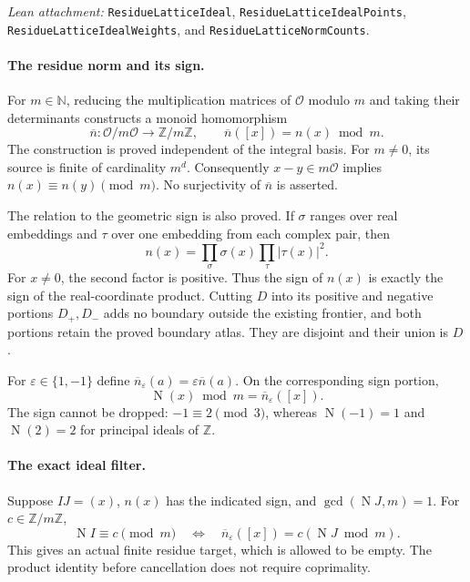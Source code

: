 \documentclass[11pt]{article}
\newcommand{\OO}{\mathcal O}
\newcommand{\ZZ}{\mathbb Z}
\newcommand{\NN}{\mathbb N}
\newcommand{\Nm}{\operatorname N}
\newcommand{\absn}[1]{\lvert #1\rvert}
\begin{document}
\smallskip
\noindent\emph{Lean attachment:}
\texttt{ResidueLatticeIdeal}, \texttt{ResidueLatticeIdealPoints},
\texttt{ResidueLatticeIdealWeights}, and \texttt{ResidueLatticeNormCounts}.

\newpage
\paragraph{The residue norm and its sign.}
For $m\in\NN$, reducing the multiplication matrices of $\OO$ modulo $m$
and taking their determinants constructs a monoid homomorphism
\[
 \overline n:\OO/m\OO\longrightarrow\ZZ/m\ZZ,
 \qquad \overline n([x])=n(x)\bmod m.
\]
The construction is proved independent of the integral basis.
For $m\ne0$, its source is finite of cardinality $m^d$.
Consequently $x-y\in m\OO$ implies $n(x)\equiv n(y)\pmod m$.
No surjectivity of $\overline n$ is asserted.

The relation to the geometric sign is also proved. If $\sigma$ ranges over
real embeddings and $\tau$ over one embedding from each complex pair, then
\[
 n(x)=\prod_{\sigma}\sigma(x)\prod_{\tau}\absn{\tau(x)}^2.
\]
For $x\ne0$, the second factor is positive. Thus the sign of $n(x)$ is
exactly the sign of the real-coordinate product. Cutting $D$ into its
positive and negative portions $D_+,D_-$ adds no boundary outside the
existing frontier, and both portions retain the proved boundary atlas.
They are disjoint and their union is $D$.

For $\varepsilon\in\{1,-1\}$ define
$\overline n_{\varepsilon}(a)=\varepsilon\overline n(a)$.
On the corresponding sign portion,
\[
 \Nm(x)\bmod m=\overline n_{\varepsilon}([x]).
\]
The sign cannot be dropped: $-1\equiv2\pmod3$, whereas
$\Nm(-1)=1$ and $\Nm(2)=2$ for principal ideals of $\ZZ$.

\paragraph{The exact ideal filter.}
Suppose $IJ=(x)$, $n(x)$ has the indicated sign, and
$\gcd(\Nm J,m)=1$. For $c\in\ZZ/m\ZZ$,
\[
 \Nm I\equiv c\pmod m
 \quad\Longleftrightarrow\quad
 \overline n_{\varepsilon}([x])=c(\Nm J\bmod m).
\]
This gives an actual finite residue target, which is allowed to be empty.
The product identity before cancellation does not require coprimality.
\end{document}
